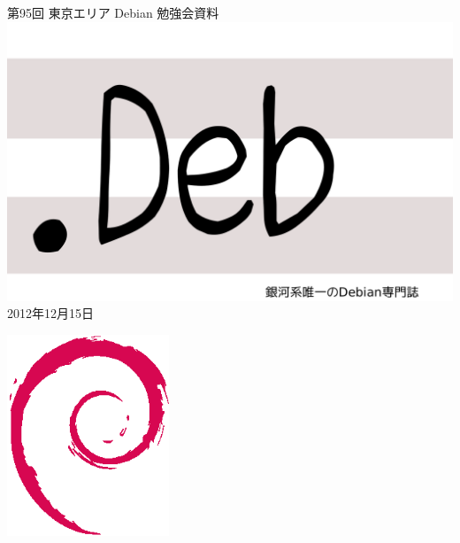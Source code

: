 \documentclass[mingoth,a4paper]{jsarticle}
\newcommand{\debmtgyear}{2012}
\newcommand{\debmtgmonth}{12}
\newcommand{\debmtgdate}{15}
\newcommand{\debmtgnumber}{95}
\begin{document}
\begin{titlepage}
\thispagestyle{empty}

\vspace*{-2cm}
第\debmtgnumber{}回 東京エリア Debian 勉強会資料\\
\hspace*{-2cm}
\includegraphics{image2012-natsu/dotdeb.pdf}\\
\hfill{}\debmtgyear{}年\debmtgmonth{}月\debmtgdate{}日



\vspace*{-2cm}
\hfill{}\includegraphics[height=6cm]{image200502/openlogo-nd.eps}
\end{titlepage}

\end{document}
